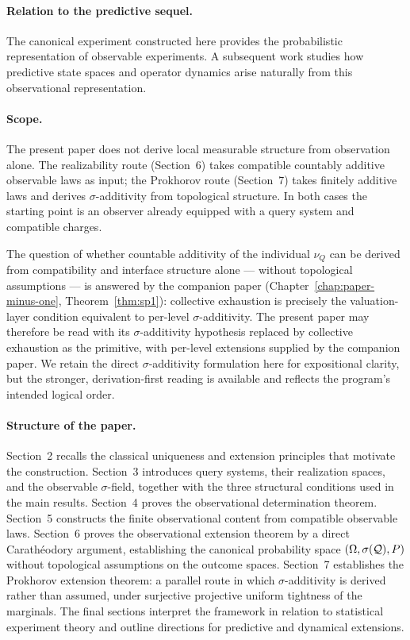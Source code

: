 \paragraph{Relation to the predictive sequel.}
The canonical experiment constructed here provides the probabilistic
representation of observable experiments.  A subsequent work studies
how predictive state spaces and operator dynamics arise naturally from
this observational representation.

\paragraph{Scope.}
The present paper does not derive local measurable structure from
observation alone. The realizability route (Section~6) takes
compatible countably additive observable laws as input; the Prokhorov
route (Section~7) takes finitely additive laws and derives
$\sigma$-additivity from topological structure.  In both cases the
starting point is an observer already equipped with a query system
and compatible charges.

The question of whether countable additivity of the individual
$\nu_Q$ can be derived from compatibility and interface structure
alone --- without topological assumptions --- is answered by the
companion paper (Chapter~\ref{chap:paper-minus-one}, Theorem~\ref{thm:sp1}):
collective exhaustion is precisely the valuation-layer condition
equivalent to per-level $\sigma$-additivity.  The present paper may
therefore be read with its $\sigma$-additivity hypothesis replaced by
collective exhaustion as the primitive, with per-level extensions
supplied by the companion paper.  We retain the direct
$\sigma$-additivity formulation here for expositional clarity, but
the stronger, derivation-first reading is available and reflects the
program's intended logical order.

\paragraph{Structure of the paper.}
Section~2 recalls the classical uniqueness and extension principles
that motivate the construction.  Section~3 introduces query systems,
their realization spaces, and the observable $\sigma$-field, together
with the three structural conditions used in the main results.
Section~4 proves the observational determination theorem.
Section~5 constructs the finite observational content from compatible
observable laws.  Section~6 proves the observational extension theorem
by a direct Carathéodory argument, establishing the canonical probability
space $(\Omega,\sigma(\mathcal{Q}),P)$ without topological assumptions on the
outcome spaces.  Section~7 establishes the Prokhorov extension theorem:
a parallel route in which $\sigma$-additivity is derived rather than
assumed, under surjective projective uniform tightness of the marginals.
The final sections interpret the framework in relation to statistical
experiment theory and outline directions for predictive and dynamical
extensions.

